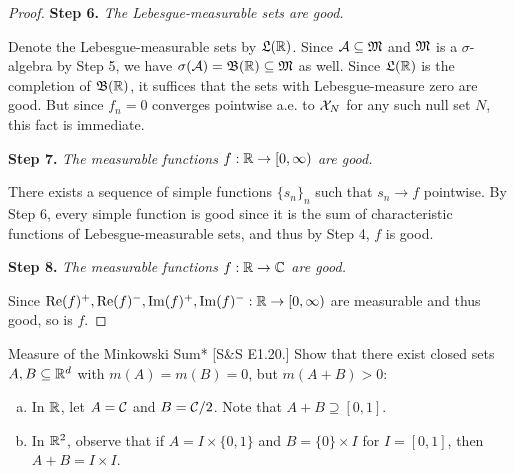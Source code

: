 \begin{proof}
    \textbf{Step 6.} \emph{The Lebesgue-measurable sets are good.}

    Denote the Lebesgue-measurable sets by \(\mathfrak{L}(\mathbb{R})\). Since \(\mathcal{A} \subseteq \mathfrak{M}\) and \(\mathfrak{M}\) is a \(\sigma\)-algebra by Step 5, we have \(\sigma(\mathcal{A}) = \mathfrak{B}(\mathbb{R}) \subseteq \mathfrak{M}\) as well. Since \(\mathfrak{L}(\mathbb{R})\) is the completion of \(\mathfrak{B}(\mathbb{R})\), it suffices that the sets with Lebesgue-measure zero are good. But since \(f_n = 0\) converges pointwise a.e. to \(\mathcal{X}_N\) for any such null set \(N\), this fact is immediate. 

    \textbf{Step 7.} \emph{The measurable functions \(f : \mathbb{R} \to [0, \infty)\) are good.}

    There exists a sequence of simple functions \(\{s_n\}_n\) such that \(s_n \to f\) pointwise. By Step 6, every simple function is good since it is the sum of characteristic functions of Lebesgue-measurable sets, and thus by Step 4, \(f\) is good. 

    \textbf{Step 8.} \emph{The measurable functions \(f : \mathbb{R} \to \mathbb{C}\) are good.}

    Since \(\Re(f)^+, \Re(f)^-, \Im(f)^+, \Im(f)^- : \mathbb{R} \to [0, \infty)\) are measurable and thus good, so is \(f\). 
\end{proof}

\begin{problem}{Measure of the Minkowski Sum}*
    [S\&S E1.20.] Show that there exist closed sets \(A,B \subseteq \mathbb{R}^d\) with \(m(A) = m(B) = 0\), but \(m(A+B) > 0\):
    \begin{enumerate}[(a)]
        \itemsep0em
        \item In \(\mathbb{R}\), let \(A = \mathcal{C}\) and \(B = \mathcal{C}/2\). Note that \(A+B \supseteq [0, 1]\).
        \item In \(\mathbb{R}^2\), observe that if \(A = I \times \{0,1\}\) and \(B = \{0\} \times I\) for \(I = [0,1]\), then \(A+B = I \times I\). 
    \end{enumerate}
\end{problem}

